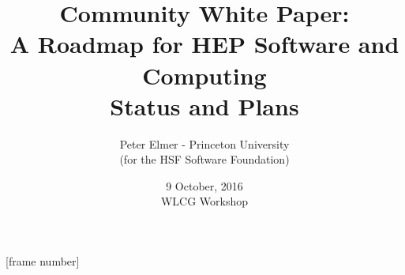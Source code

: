 \documentclass{beamer}
\title{Community White Paper: \\
       A Roadmap for HEP Software and Computing \\
       Status and Plans}
\author{Peter Elmer - Princeton University \\
        (for the HSF Software Foundation)}
\date{9 October, 2016 \\ WLCG Workshop}
\begin{document}
\maketitle

%
%

[frame number]

%







%







%



%
%





%






%




%
%
%





\end{document}
